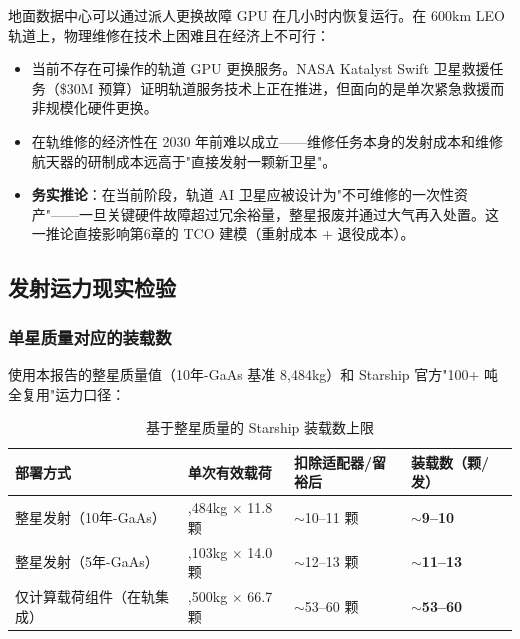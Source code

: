 地面数据中心可以通过派人更换故障 GPU 在几小时内恢复运行。在 600\;km LEO 轨道上，物理维修在技术上困难且在经济上不可行：

\begin{itemize}[leftmargin=*]
    \item 当前不存在可操作的轨道 GPU 更换服务。NASA Katalyst Swift 卫星救援任务（\$30M 预算）证明轨道服务技术上正在推进，但面向的是单次紧急救援而非规模化硬件更换\cite{nasa2026katalyst}。
    \item 在轨维修的经济性在 2030 年前难以成立——维修任务本身的发射成本和维修航天器的研制成本远高于"直接发射一颗新卫星"。
    \item \textbf{务实推论}：在当前阶段，轨道 AI 卫星应被设计为"不可维修的一次性资产"——一旦关键硬件故障超过冗余裕量，整星报废并通过大气再入处置。这一推论直接影响第6章的 TCO 建模（重射成本 + 退役成本）。
\end{itemize}

\subsection{发射运力现实检验}

\subsubsection{单星质量对应的装载数}

使用本报告的整星质量值（10年-GaAs 基准 8,484\;kg）和 Starship 官方"100+ 吨全复用"运力口径：

\begin{table}[H]
\centering
\small
\caption{基于整星质量的 Starship 装载数上限}
\label{tab:launch_manifest}
\begin{tabularx}{\textwidth}{
  >{\raggedright\arraybackslash}p{2.9cm}
  >{\centering\arraybackslash}p{2.7cm}
  >{\centering\arraybackslash}p{2.6cm}
  >{\centering\arraybackslash}X
}
\toprule
\textbf{部署方式} & \textbf{单次有效载荷} & \textbf{扣除适配器/留裕后} & \textbf{装载数（颗/发）} \\
\midrule
整星发射（10年-GaAs）   & 8,484\;kg $\times$ 11.8 颗 & $\sim$10--11 颗 & \textbf{$\sim$9--10} \\
整星发射（5年-GaAs）    & 7,103\;kg $\times$ 14.0 颗 & $\sim$12--13 颗 & \textbf{$\sim$11--13} \\
仅计算载荷组件（在轨集成） & 1,500\;kg $\times$ 66.7 颗 & $\sim$53--60 颗   & \textbf{$\sim$53--60} \\
\bottomrule
\end{tabularx}
\end{table}


